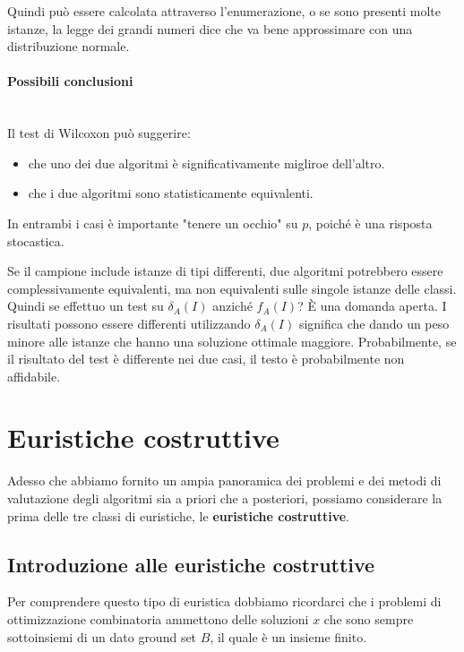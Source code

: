 \documentclass{article}
\begin{document}
    Quindi può essere calcolata attraverso l'enumerazione, o se sono presenti molte istanze,
    la legge dei grandi numeri dice che va bene approssimare con una distribuzione normale.

    \paragraph{Possibili conclusioni}\mbox{}\\
    Il test di Wilcoxon può suggerire:
    \begin{itemize}
        \item che uno dei due algoritmi è significativamente migliroe dell'altro.
        \item che i due algoritmi sono statisticamente equivalenti.
    \end{itemize}
    In entrambi i casi è importante "tenere un occhio" su $p$, poiché è una risposta
    stocastica.

    Se il campione include istanze di tipi differenti, due algoritmi potrebbero essere
    complessivamente equivalenti, ma non equivalenti sulle singole istanze delle classi.
    Quindi se effettuo un test su $\delta_A(I)$ anziché $f_A(I)$? È una domanda aperta.
    I risultati possono essere differenti utilizzando $\delta_A(I)$ significa che dando
    un peso minore alle istanze che hanno una soluzione ottimale maggiore. Probabilmente,
    se il risultato del test è differente nei due casi, il testo è probabilmente non
    affidabile.

    \section{Euristiche costruttive}
    Adesso che abbiamo fornito un ampia panoramica dei problemi e dei metodi di valutazione
    degli algoritmi sia a priori che a posteriori, possiamo considerare la prima delle
    tre classi di euristiche, le \textbf{euristiche costruttive}.

    \subsection{Introduzione alle euristiche costruttive}
    Per comprendere questo tipo di euristica dobbiamo ricordarci che i problemi di ottimizzazione
    combinatoria ammettono delle soluzioni $x$ che sono sempre sottoinsiemi di
    un dato ground set $B$, il quale è un insieme finito.
\end{document}
